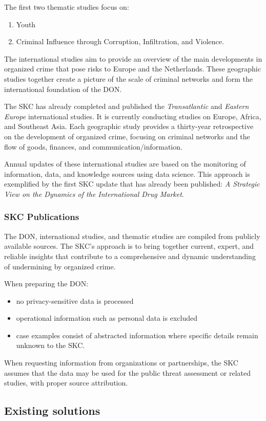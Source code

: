 The first two thematic studies focus on:
\begin{enumerate}
	\item Youth
	\item Criminal Influence through Corruption, Infiltration, and Violence.
\end{enumerate}

The international studies aim to provide an overview of the main developments in organized crime that pose risks to Europe and the Netherlands. These geographic studies together create a picture of the scale of criminal networks and form the international foundation of the DON.

The SKC has already completed and published the \emph{Transatlantic} and \emph{Eastern Europe} international studies. It is currently conducting studies on Europe, Africa, and Southeast Asia. Each geographic study provides a thirty-year retrospective on the development of organized crime, focusing on criminal networks and the flow of goods, finances, and communication/information.

Annual updates of these international studies are based on the monitoring of information, data, and knowledge sources using data science. This approach is exemplified by the first SKC update that has already been published: \emph{A Strategic View on the Dynamics of the International Drug Market}.

\subsubsection{SKC Publications}
\label{subsubsec:SKC-publications}
The DON, international studies, and thematic studies are compiled from publicly available sources. The SKC’s approach is to bring together current, expert, and reliable insights that contribute to a comprehensive and dynamic understanding of undermining by organized crime.

When preparing the DON:
\begin{itemize}
	\item no privacy-sensitive data is processed
	\item operational information such as personal data is excluded
	\item case examples consist of abstracted information where specific details remain unknown to the SKC.
\end{itemize}

When requesting information from organizations or partnerships, the SKC assumes that the data may be used for the public threat assessment or related studies, with proper source attribution.

\subsection{Existing solutions}
\label{subsec:API}
